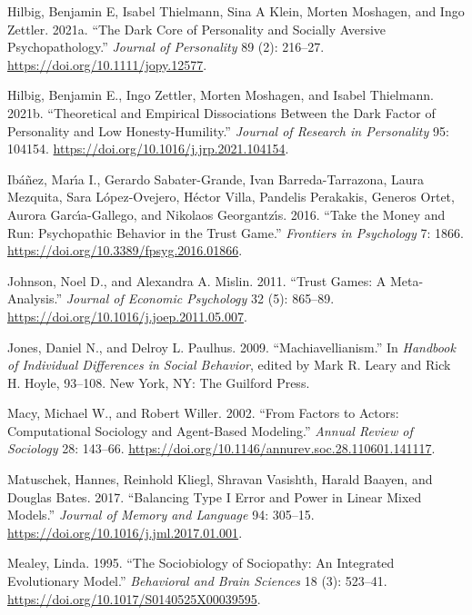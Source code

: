\documentclass[
]{article}
\newlength{\cslhangindent}
\newenvironment{CSLReferences}[2] %
 {\begin{list}{}{%
  \setlength{\itemindent}{0pt}
  \setlength{\leftmargin}{0pt}
  \setlength{\parsep}{0pt}
  \ifodd #1
   \setlength{\leftmargin}{\cslhangindent}
   \setlength{\itemindent}{-1\cslhangindent}
  \fi
  \setlength{\itemsep}{#2\baselineskip}}}
 {\end{list}}
\begin{document}
\begin{CSLReferences}{1}{0}
Hilbig, Benjamin E, Isabel Thielmann, Sina A Klein, Morten Moshagen, and Ingo Zettler. 2021a. {``The Dark Core of Personality and Socially Aversive Psychopathology.''} \emph{Journal of Personality} 89 (2): 216--27. \url{https://doi.org/10.1111/jopy.12577}.

Hilbig, Benjamin E., Ingo Zettler, Morten Moshagen, and Isabel Thielmann. 2021b. {``Theoretical and Empirical Dissociations Between the Dark Factor of Personality and Low Honesty-Humility.''} \emph{Journal of Research in Personality} 95: 104154. \url{https://doi.org/10.1016/j.jrp.2021.104154}.

Ibáñez, Marı́a I., Gerardo Sabater-Grande, Ivan Barreda-Tarrazona, Laura Mezquita, Sara López-Ovejero, Héctor Villa, Pandelis Perakakis, Generos Ortet, Aurora Garcı́a-Gallego, and Nikolaos Georgantzı́s. 2016. {``Take the Money and Run: {Psychopathic} Behavior in the Trust Game.''} \emph{Frontiers in Psychology} 7: 1866. \url{https://doi.org/10.3389/fpsyg.2016.01866}.

Johnson, Noel D., and Alexandra A. Mislin. 2011. {``Trust Games: A Meta-Analysis.''} \emph{Journal of Economic Psychology} 32 (5): 865--89. \url{https://doi.org/10.1016/j.joep.2011.05.007}.

Jones, Daniel N., and Delroy L. Paulhus. 2009. {``{Machiavellianism}.''} In \emph{Handbook of Individual Differences in Social Behavior}, edited by Mark R. Leary and Rick H. Hoyle, 93--108. New York, NY: The Guilford Press.

Macy, Michael W., and Robert Willer. 2002. {``From Factors to Actors: Computational Sociology and Agent-Based Modeling.''} \emph{Annual Review of Sociology} 28: 143--66. \url{https://doi.org/10.1146/annurev.soc.28.110601.141117}.

Matuschek, Hannes, Reinhold Kliegl, Shravan Vasishth, Harald Baayen, and Douglas Bates. 2017. {``Balancing {Type I} Error and Power in Linear Mixed Models.''} \emph{Journal of Memory and Language} 94: 305--15. \url{https://doi.org/10.1016/j.jml.2017.01.001}.

Mealey, Linda. 1995. {``The Sociobiology of Sociopathy: {An} Integrated Evolutionary Model.''} \emph{Behavioral and Brain Sciences} 18 (3): 523--41. \url{https://doi.org/10.1017/S0140525X00039595}.


\end{CSLReferences}
\end{document}
